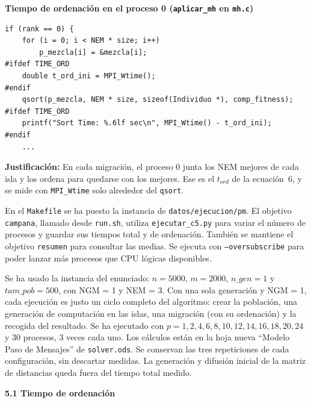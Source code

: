 \documentclass[12pt]{article}
\begin{document}
\begin{enumerate}
\vspace{0.5cm}

\medskip
\noindent\textbf{Tiempo de ordenación en el proceso 0 (\texttt{aplicar\_mh} en \texttt{mh.c})}\par
\smallskip

\begin{lstlisting}[style=EstiloC]
if (rank == 0) {
	for (i = 0; i < NEM * size; i++)
		p_mezcla[i] = &mezcla[i];
#ifdef TIME_ORD
	double t_ord_ini = MPI_Wtime();
#endif
	qsort(p_mezcla, NEM * size, sizeof(Individuo *), comp_fitness);
#ifdef TIME_ORD
	printf("Sort Time: %.6lf sec\n", MPI_Wtime() - t_ord_ini);
#endif
	...
\end{lstlisting}

\textbf{Justificación:} En cada migración, el proceso 0 junta los NEM mejores de cada isla y los ordena para quedarse con los mejores. Ese es el $t_{ord}$ de la ecuación~6, y se mide con \texttt{MPI\_Wtime} solo alrededor del \texttt{qsort}.

\vspace{0.5cm}

En el \texttt{Makefile} se ha puesto la instancia de \texttt{datos/ejecucion/pm}. El objetivo \texttt{campana}, llamado desde \texttt{run.sh}, utiliza \texttt{ejecutar\_c5.py} para variar el número de procesos y guardar sus tiempos total y de ordenación. También se mantiene el objetivo \texttt{resumen} para consultar las medias. Se ejecuta con \texttt{--oversubscribe} para poder lanzar más procesos que CPU lógicas disponibles.

Se ha usado la instancia del enunciado: $n = 5000$, $m = 2000$, $n\_gen = 1$ y $tam\_pob = 500$, con NGM = 1 y NEM = 3. Con una sola generación y NGM = 1, cada ejecución es justo un ciclo completo del algoritmo: crear la población, una generación de computación en las islas, una migración (con su ordenación) y la recogida del resultado. Se ha ejecutado con $p = 1, 2, 4, 6, 8, 10, 12, 14, 16, 18, 20, 24$ y 30 procesos, 3 veces cada uno. Los cálculos están en la hoja nueva ``Modelo Paso de Mensajes'' de \texttt{solver.ods}. Se conservan las tres repeticiones de cada configuración, sin descartar medidas. La generación y difusión inicial de la matriz de distancias queda fuera del tiempo total medido.

\medskip
\noindent\textbf{5.1 Tiempo de ordenación}\par
\smallskip


\end{enumerate}
\end{document}
